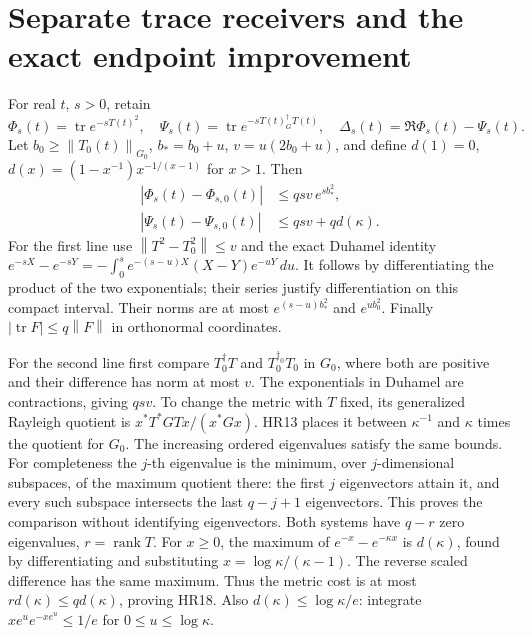 \documentclass[11pt]{article}
\newcommand{\tr}{\operatorname{tr}}\newcommand{\dd}{\dagger_G}
\newcommand{\norm}[1]{\left\lVert#1\right\rVert}
\begin{document}
\section{Separate trace receivers and the exact endpoint improvement}

For real \(t\), \(s>0\), retain
\begin{equation}\tag{HR17}\label{HR17}
\Phi_s(t)=\tr e^{-sT(t)^2},\quad
\Psi_s(t)=\tr e^{-sT(t)^\dd T(t)},\quad
\Delta_s(t)=\Re\Phi_s(t)-\Psi_s(t).
\end{equation}
Let \(b_0\ge\norm{T_0(t)}_{G_0}\), \(b_*=b_0+u\),
\(v=u(2b_0+u)\), and define
\(d(1)=0\), \(d(x)=(1-x^{-1})x^{-1/(x-1)}\) for \(x>1\).
Then
\begin{equation}\tag{HR18}\label{HR18}
\begin{split}
|\Phi_s(t)-\Phi_{s,0}(t)|&\le qsv\,e^{s b_*^2},\\
|\Psi_s(t)-\Psi_{s,0}(t)|&\le qsv+q d(\kappa).
\end{split}
\end{equation}
For the first line use \(\norm{T^2-T_0^2}\le v\) and the exact
Duhamel identity
\(e^{-sX}-e^{-sY}=-\int_0^s e^{-(s-u)X}(X-Y)e^{-uY}\,du\).
It follows by differentiating the product of the two exponentials;
their series justify differentiation on this compact interval.
Their norms are at most \(e^{(s-u)b_*^2}\) and \(e^{ub_0^2}\).
Finally \(|\tr F|\le q\norm F\) in orthonormal coordinates.

For the second line first compare \(T^\dagger_0T\) and
\(T_0^{\dagger_0}T_0\) in \(G_0\), where both are positive and their
difference has norm at most \(v\). The exponentials in Duhamel are
contractions, giving \(qsv\). To change the metric with \(T\) fixed,
its generalized Rayleigh quotient is
\(x^*T^*GTx/(x^*Gx)\). HR13 places it between \(\kappa^{-1}\) and
\(\kappa\) times the quotient for \(G_0\). The increasing ordered
eigenvalues satisfy the same bounds. For completeness the \(j\)-th
eigenvalue is the minimum, over \(j\)-dimensional subspaces, of the
maximum quotient there: the first \(j\) eigenvectors attain it, and
every such subspace intersects the last \(q-j+1\) eigenvectors.
This proves the comparison without identifying eigenvectors.
Both systems have \(q-r\) zero eigenvalues, \(r=\operatorname{rank}T\).
For \(x\ge0\), the maximum of \(e^{-x}-e^{-\kappa x}\) is
\(d(\kappa)\), found by differentiating and substituting
\(x=\log\kappa/(\kappa-1)\). The reverse scaled difference has
the same maximum. Thus the metric cost is at most
\(r d(\kappa)\le qd(\kappa)\), proving HR18.
Also \(d(\kappa)\le\log\kappa/e\): integrate
\(xe^u e^{-xe^u}\le1/e\) for \(0\le u\le\log\kappa\).
\end{document}
